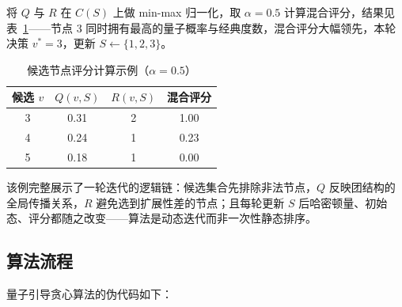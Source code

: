 \documentclass[pre,twocolumn]{revtex4-2}
\begin{document}
将 $Q$ 与 $R$ 在 $C(S)$ 上做 min-max 归一化，取 $\alpha=0.5$ 计算混合评分，结果见表~\ref{tbl:example}——节点 3 同时拥有最高的量子概率与经典度数，混合评分大幅领先，本轮决策 $v^*=3$，更新 $S\leftarrow\{1,2,3\}$。

\begin{table}[H]
\caption{候选节点评分计算示例（$\alpha=0.5$）}
\label{tbl:example}
\centering
\begin{tabular}{cccc}
\hline\hline
候选 $v$ & $Q(v,S)$ & $R(v,S)$ & 混合评分 \\
\hline
3 & 0.31 & 2 & 1.00 \\
4 & 0.24 & 1 & 0.23 \\
5 & 0.18 & 1 & 0.00 \\
\hline\hline
\end{tabular}
\end{table}

该例完整展示了一轮迭代的逻辑链：候选集合先排除非法节点，$Q$ 反映团结构的全局传播关系，$R$ 避免选到扩展性差的节点；且每轮更新 $S$ 后哈密顿量、初始态、评分都随之改变——算法是动态迭代而非一次性静态排序。

\subsection{算法流程}
量子引导贪心算法的伪代码如下：
\end{document}
